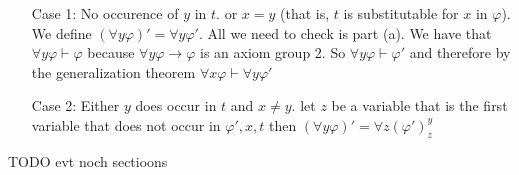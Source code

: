 {\begin{itemize}
\begin{itemize}
            \item[Case 1:] No occurence of $y$ in $t$. or $x=y$ (that is, $t$ is substitutable for $x$ in $\varphi$). We define $(\forall y \varphi)' = \forall y \varphi'$. All we need to check is part (a). 
                We have that $\forall y \varphi \vdash \varphi$ because $\forall y \varphi \to \varphi$ is an axiom group 2.
                So $\forall y \varphi \vdash \varphi'$ and therefore by the generalization theorem $\forall x \varphi \vdash \forall y \varphi'$
            \item[Case 2:] Either $y$ does occur in $t$ and $x\neq y$. let $z$ be a variable that is the first variable that does not occur in $\varphi', x, t$ then
                $(\forall y \varphi)' = \forall z (\varphi')^y_z$
        \end{itemize}
    \end{itemize}
}



TODO evt noch sectioons
